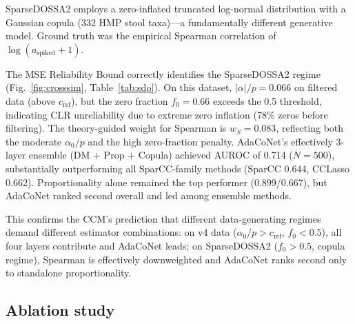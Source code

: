 \documentclass[unnumsec,webpdf,contemporary,large,numbered]{oup-authoring-template}
\theoremstyle{plain}
\theoremstyle{definition}
\begin{document}
SparseDOSSA2 employs a zero-inflated truncated log-normal distribution with a Gaussian copula (332 HMP stool taxa)---a fundamentally different generative model. Ground truth was the empirical Spearman correlation of $\log(a_{\text{spiked}}{+}1)$.

The MSE Reliability Bound correctly identifies the SparseDOSSA2 regime (Fig.~\ref{fig:crosssim}, Table~\ref{tab:sdo}). On this dataset, $|\alpha|/p = 0.066$ on filtered data (above $c_{\text{ref}}$), but the zero fraction $f_0 = 0.66$ exceeds the 0.5 threshold, indicating CLR unreliability due to extreme zero inflation (78\% zeros before filtering). The theory-guided weight for Spearman is $w_S = 0.083$, reflecting both the moderate $\alpha_0/p$ and the high zero-fraction penalty. AdaCoNet's effectively 3-layer ensemble (DM + Prop + Copula) achieved AUROC of 0.714 ($N{=}500$), substantially outperforming all SparCC-family methods (SparCC 0.644, CCLasso 0.662). Proportionality alone remained the top performer (0.899/0.667), but AdaCoNet ranked second overall and led among ensemble methods.

This confirms the CCM's prediction that different data-generating regimes demand different estimator combinations: on v4 data ($\alpha_0/p > c_{\text{ref}}$, $f_0 < 0.5$), all four layers contribute and AdaCoNet leads; on SparseDOSSA2 ($f_0 > 0.5$, copula regime), Spearman is effectively downweighted and AdaCoNet ranks second only to standalone proportionality.

\subsection{Ablation study}\label{ssec:ablation}
\end{document}
